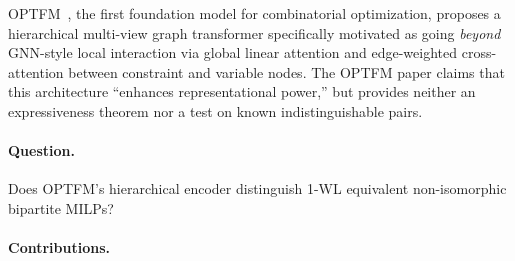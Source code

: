 \documentclass[11pt]{article}
\theoremstyle{plain}
\theoremstyle{definition}
\theoremstyle{remark}
\newcommand{\optfm}{\textsc{OPTFM}}
\begin{document}
\optfm{}~\cite{yuan2025optfm}, the first foundation model for
combinatorial optimization, proposes a hierarchical multi-view graph
transformer specifically motivated as going \emph{beyond} GNN-style local
interaction via global linear attention and edge-weighted cross-attention
between constraint and variable nodes. The OPTFM paper claims that this
architecture ``enhances representational power,'' but provides neither an
expressiveness theorem nor a test on known indistinguishable pairs.

\paragraph{Question.} Does \optfm{}'s hierarchical encoder distinguish 1-WL
equivalent non-isomorphic bipartite MILPs?

\paragraph{Contributions.}
\end{document}
